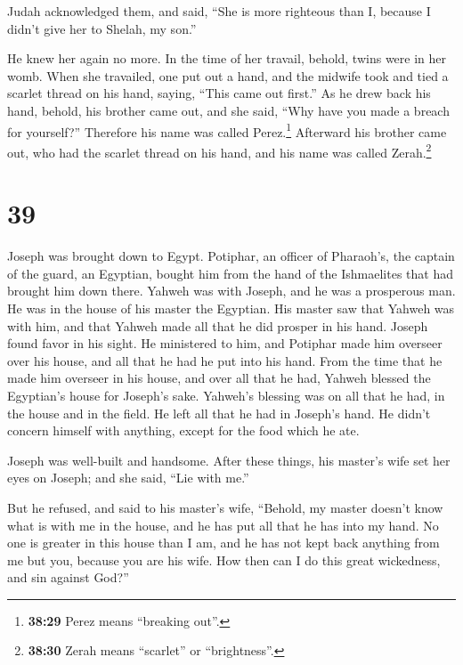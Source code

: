  Judah acknowledged them, and said, ``She is more
righteous than I, because I didn't give her to Shelah, my son.''

He knew her again no more.  In the time of her travail,
behold, twins were in her womb.  When she travailed, one
put out a hand, and the midwife took and tied a scarlet thread on his
hand, saying, ``This came out first.''  As he drew back
his hand, behold, his brother came out, and she said, ``Why have you
made a breach for yourself?'' Therefore his name was called
Perez.\footnote{\textbf{38:29} Perez means ``breaking out''.}
 Afterward his brother came out, who had the scarlet
thread on his hand, and his name was called Zerah.\footnote{\textbf{38:30}
  Zerah means ``scarlet'' or ``brightness''.}

\hypertarget{section-38}{%
\section{39}\label{section-38}}

 Joseph was brought down to Egypt. Potiphar, an officer of
Pharaoh's, the captain of the guard, an Egyptian, bought him from the
hand of the Ishmaelites that had brought him down there. 
Yahweh was with Joseph, and he was a prosperous man. He was in the house
of his master the Egyptian.  His master saw that Yahweh
was with him, and that Yahweh made all that he did prosper in his hand.
 Joseph found favor in his sight. He ministered to him,
and Potiphar made him overseer over his house, and all that he had he
put into his hand.  From the time that he made him
overseer in his house, and over all that he had, Yahweh blessed the
Egyptian's house for Joseph's sake. Yahweh's blessing was on all that he
had, in the house and in the field.  He left all that he
had in Joseph's hand. He didn't concern himself with anything, except
for the food which he ate.

Joseph was well-built and handsome.  After these things,
his master's wife set her eyes on Joseph; and she said, ``Lie with me.''

 But he refused, and said to his master's wife, ``Behold,
my master doesn't know what is with me in the house, and he has put all
that he has into my hand.  No one is greater in this house
than I am, and he has not kept back anything from me but you, because
you are his wife. How then can I do this great wickedness, and sin
against God?''

